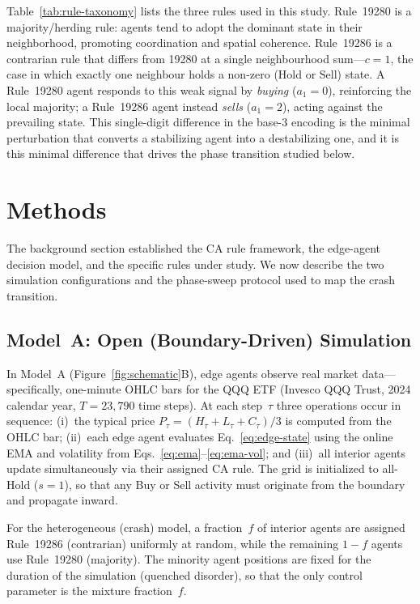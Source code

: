 \documentclass{article}
\theoremstyle{definition}
\theoremstyle{remark}
\begin{document}
Table~\ref{tab:rule-taxonomy} lists the three rules used in this study. Rule~19280 is a
majority/herding rule: agents tend to adopt the dominant state in their neighborhood,
promoting coordination and spatial coherence. Rule~19286 is a contrarian rule that differs
from 19280 at a single neighbourhood sum---$c = 1$, the case in which exactly one neighbour
holds a non-zero (Hold or Sell) state. A Rule~19280 agent responds to this weak signal by
\emph{buying} ($a_1 = 0$), reinforcing the local majority; a Rule~19286 agent instead
\emph{sells} ($a_1 = 2$), acting against the prevailing state. This single-digit difference
in the base-3 encoding is the minimal perturbation that converts a stabilizing agent into a
destabilizing one, and it is this minimal difference that drives the phase transition
studied below.


\section{Methods}
\label{sec:methods}

The background section established the CA rule framework, the edge-agent decision model,
and the specific rules under study. We now describe the two simulation configurations
and the phase-sweep protocol used to map the crash transition.

\subsection{Model~A: Open (Boundary-Driven) Simulation}
\label{sec:model-a}
In Model~A (Figure~\ref{fig:schematic}B), edge agents observe real market
data---specifically, one-minute OHLC bars for the QQQ ETF (Invesco QQQ Trust, 2024
calendar year, $T = 23{,}790$ time steps). At each step~$\tau$ three operations occur in
sequence: (i)~the typical price $P_\tau = (H_\tau + L_\tau + C_\tau)/3$ is computed from
the OHLC bar; (ii)~each edge agent evaluates Eq.~\eqref{eq:edge-state} using the online
EMA and volatility from Eqs.~\eqref{eq:ema}--\eqref{eq:ema-vol}; and (iii)~all interior
agents update simultaneously via their assigned CA rule. The grid is initialized to
all-Hold ($s=1$), so that any Buy or Sell activity must originate from the boundary and
propagate inward.

For the heterogeneous (crash) model, a fraction~$f$ of interior agents are assigned
Rule~19286 (contrarian) uniformly at random, while the remaining $1-f$ agents use
Rule~19280 (majority). The minority agent positions are fixed for the duration of the
simulation (quenched disorder), so that the only control parameter is the mixture
fraction~$f$.
\end{document}

